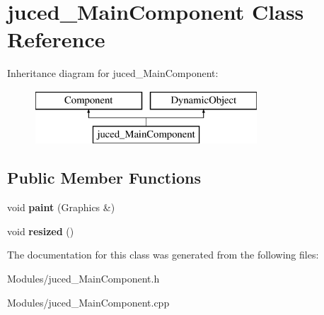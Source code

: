 \hypertarget{classjuced___main_component}{\section{juced\-\_\-\-Main\-Component Class Reference}
\label{classjuced___main_component}
}
Inheritance diagram for juced\-\_\-\-Main\-Component\-:\begin{figure}[H]
\begin{center}
\leavevmode
\includegraphics[height=2.000000cm]{classjuced___main_component}
\end{center}
\end{figure}
\subsection*{Public Member Functions}
\begin{DoxyCompactItemize}
\item 
\hypertarget{classjuced___main_component_a1eb5fa768f44c0a13d26d84e04828d6e}{void {\bfseries paint} (Graphics \&)}\label{classjuced___main_component_a1eb5fa768f44c0a13d26d84e04828d6e}

\item 
\hypertarget{classjuced___main_component_aaba6bf2fb0c9ca18a24255336cf74ced}{void {\bfseries resized} ()}\label{classjuced___main_component_aaba6bf2fb0c9ca18a24255336cf74ced}

\end{DoxyCompactItemize}


The documentation for this class was generated from the following files\-:\begin{DoxyCompactItemize}
\item 
Modules/juced\-\_\-\-Main\-Component.\-h\item 
Modules/juced\-\_\-\-Main\-Component.\-cpp\end{DoxyCompactItemize}
